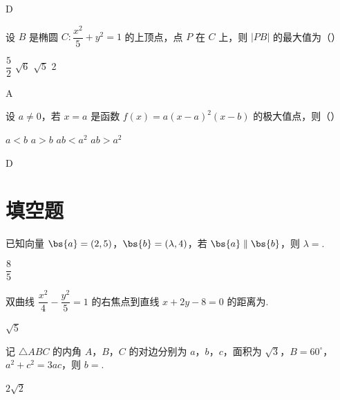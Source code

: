 \begin{answer}
D
\end{answer}

\begin{problem}
设 \(B\) 是椭圆 \(C:\dfrac{x^2}{5}+y^2=1\) 的上顶点，点 \(P\) 在 \(C\) 上，则 \(\lvert PB\rvert\) 的最大值为（\quad）

\choices
    {\(\dfrac{5}{2}\)}
    {\(\sqrt6\)}
    {\(\sqrt5\)}
    {2}
\end{problem}

\begin{answer}
A
\end{answer}

\begin{problem}
设 \(a\ne0\)，若 \(x=a\) 是函数 \(f(x)=a\left(x-a\right)^2\left(x-b\right)\) 的极大值点，则（\quad）

\choices
    {\(a<b\)}
    {\(a>b\)}
    {\(ab<a^2\)}
    {\(ab>a^2\)}
\end{problem}

\begin{answer}
D
\end{answer}

\section{填空题}

\begin{problem}
已知向量 \(\bs{a}=(2,5)\)，\(\bs{b}=(\lambda,4)\)，若 \(\bs{a}\parallel\bs{b}\)，则 \(\lambda=\)\fillinblank{}.
\end{problem}

\begin{answer}
\(\dfrac{8}{5}\)
\end{answer}

\begin{problem}
双曲线 \(\dfrac{x^2}{4}-\dfrac{y^2}{5}=1\) 的右焦点到直线 \(x+2y-8=0\) 的距离为\fillinblank{}.
\end{problem}

\begin{answer}
\(\sqrt5\)
\end{answer}

\begin{problem}
记 \(\triangle ABC\) 的内角 \(A\)，\(B\)，\(C\) 的对边分别为 \(a\)，\(b\)，\(c\)，面积为 \(\sqrt3\)，\(B=60^\circ\)，\(a^2+c^2=3ac\)，则 \(b=\)\fillinblank{}.
\end{problem}

\begin{answer}
\(2\sqrt2\)
\end{answer}

